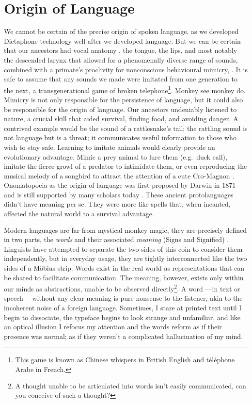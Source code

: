 \section{Origin of Language}
We cannot be certain of the precise origin of spoken language, as we developed Dictaphone technology well after we developed language. But we can be certain that our ancestors had vocal anatomy \cite{ghazanfar2008evolution}, the tongue, the lips, and most notably the descended larynx that allowed for a phenomenally diverse range of sounds, combined with a primate's proclivity for nonconscious behavioural mimicry, \cite{whiten2000primate, castro2004evolution}. It is safe to assume that any sounds we made were imitated from one generation to the next, a transgenerational game of broken telephone\footnote{This game is known as Chinese whispers in British English and téléphone Arabe in French.}. Monkey see monkey do. Mimicry is not only responsible for the persistence of language, but it could also be responsible for the origin of language. Our ancestors undeniably listened to nature, a crucial skill that aided survival, finding food, and avoiding danger. A contrived example would be the sound of a rattlesnake's tail; the rattling sound is not language but is a threat; it communicates useful information to those who wish to stay safe. Learning to imitate animals would clearly provide an evolutionary advantage. Mimic a prey animal to lure them (e.g.\ duck call), imitate the fierce growl of a predator to intimidate them, or even reproducing the musical melody of a songbird to attract the attention of a cute Cro-Magnon . Onomatopoeia as the origin of language was first proposed by Darwin in 1871 \cite{darwin1871descent} and is still supported by many scholars today \cite{wood2000human, mithen2006singing, de2017evolution}. These ancient protolanguages didn't have meaning per se. They were more like spells that, when incanted, affected the natural world to a survival advantage. 

Modern languages are far from mystical monkey magic, they are precisely defined in two parts, the \textit{words} and their associated \textit{meaning} (Signs and Signified) \cite{chandler2017semiotics, de1989cours}. Linguists have attempted to separate the two sides of this coin to consider them independently, but in everyday usage, they are tightly interconnected like the two sides of a M{\"o}bius strip. Words exist in the real world as representations that can be shared to facilitate communication. The meaning, however, exists only within our minds as abstractions, unable to be observed directly\footnote{A thought unable to be articulated into words isn't easily communicated, can you conceive of such a thought?}. A word ---in text or speech--- without any clear meaning is pure nonsense to the listener, akin to the incoherent noise of a foreign language. Sometimes, I stare at printed text until I begin to dissociate, the typeface begins to look strange and unfamiliar, and like an optical illusion I refocus my attention and the words reform as if their presence was normal; as if they weren't a complicated hallucination of my mind.

